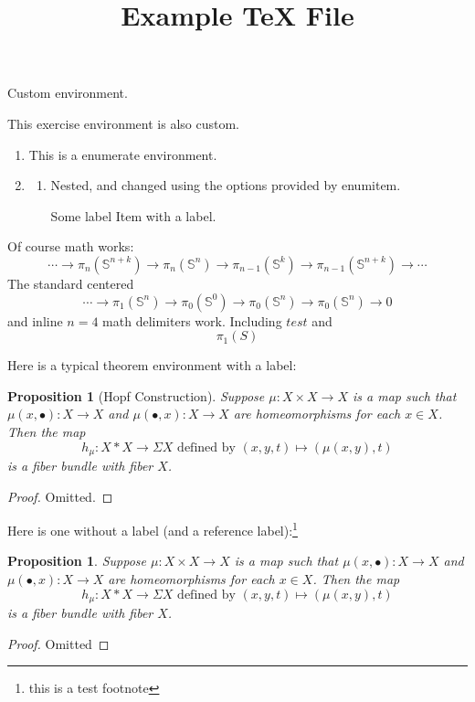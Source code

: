 \documentclass{amsart}
\title{Example TeX File}
\def\S{\mathbb{S}}
\theoremstyle{plain}
\newtheorem{proposition}[theorem]{Proposition}
\begin{document}
\begin{preliminary}
    Custom environment.
\end{preliminary}
\begin{exercise}
    This exercise environment is also custom.
    \begin{enumerate}
        \item This is a enumerate environment.
        \item
        \begin{enumerate}[font=\it]
            \item Nested, and changed using the options provided by enumitem.
            \item[Some label] Item with a label.
        \end{enumerate}
    \end{enumerate}
\end{exercise}
Of course math works:
\begin{equation}\label{eq:1}
    \cdots\to \pi_{n}(\S^{n+k})\to \pi_n(\S^n)\to \pi_{n-1}(\S^k)\to\pi_{n-1}(\S^{n+k})\to\cdots
\end{equation}
The standard centered
$$
    \cdots\to \pi_1(\S^n)\to \pi_{0}(\S^0)\to\pi_{0}(\S^{n})\to\pi_{0}(\S^{n})\to 0
$$
and inline $n=4$ math delimiters work. Including \(test\) and
\[\pi_1(S)\]

Here is a typical theorem environment with a label:
\begin{proposition}[Hopf Construction]
Suppose $\mu:X\times X\to X$ is a map such that $\mu(x,\bullet):X\to X$ and $\mu(\bullet,x):X\to X$ are homeomorphisms for each $x\in X$. Then the map
$$
    h_{\mu}:X*X\to \Sigma X\mbox{ defined by }(x,y,t)\mapsto (\mu(x,y),t)
$$
is a fiber bundle with fiber $X$.
\end{proposition}
\begin{proof}
    Omitted.
\end{proof}

Here is one without a label (and a reference label):\footnote{this is a test footnote}
\begin{proposition}\label{prop:1}
Suppose $\mu:X\times X\to X$ is a map such that $\mu(x,\bullet):X\to X$ and $\mu(\bullet,x):X\to X$ are homeomorphisms for each $x\in X$. Then the map
$$
    h_{\mu}:X*X\to \Sigma X\mbox{ defined by }(x,y,t)\mapsto (\mu(x,y),t)
$$
is a fiber bundle with fiber $X$.
\end{proposition}
\begin{proof}
    Omitted
\end{proof}
\end{document}
